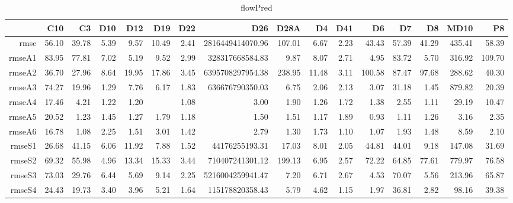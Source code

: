 \begin{table}[H]
\centering
\begin{tabular}{rrrrrrrrrrrrrrrr}
  \hline
 & C10 & C3 & D10 & D12 & D19 & D22 & D26 & D28A & D4 & D41 & D6 & D7 & D8 & MD10 & P8 \\ 
  \hline
rmse & 56.10 & 39.78 & 5.39 & 9.57 & 10.49 & 2.41 & 2816449414070.96 & 107.01 & 6.67 & 2.23 & 43.43 & 57.39 & 41.29 & 435.41 & 58.39 \\ 
  rmseA1 & 83.95 & 77.81 & 7.02 & 5.19 & 9.52 & 2.99 & 328317668584.83 & 9.87 & 8.07 & 2.71 & 4.95 & 83.72 & 5.70 & 316.92 & 109.70 \\ 
  rmseA2 & 36.70 & 27.96 & 8.64 & 19.95 & 17.86 & 3.45 & 6395708297954.38 & 238.95 & 11.48 & 3.11 & 100.58 & 87.47 & 97.68 & 288.62 & 40.30 \\ 
  rmseA3 & 74.27 & 19.96 & 1.29 & 7.76 & 6.17 & 1.83 & 636676790350.03 & 6.75 & 2.06 & 2.13 & 3.07 & 31.18 & 1.45 & 879.82 & 20.39 \\ 
  rmseA4 & 17.46 & 4.21 & 1.22 & 1.20 &  & 1.08 & 3.00 & 1.90 & 1.26 & 1.72 & 1.38 & 2.55 & 1.11 & 29.19 & 10.47 \\ 
  rmseA5 & 20.52 & 1.23 & 1.45 & 1.27 & 1.79 & 1.18 & 1.50 & 1.51 & 1.17 & 1.89 & 0.93 & 1.11 & 1.26 & 3.16 & 2.35 \\ 
  rmseA6 & 16.78 & 1.08 & 2.25 & 1.51 & 3.01 & 1.42 & 2.79 & 1.30 & 1.73 & 1.10 & 1.07 & 1.93 & 1.48 & 8.59 & 2.10 \\ 
  rmseS1 & 26.68 & 41.15 & 6.06 & 11.92 & 7.88 & 1.52 & 44176255193.31 & 17.03 & 8.01 & 2.05 & 44.81 & 44.01 & 9.18 & 147.08 & 31.69 \\ 
  rmseS2 & 69.32 & 55.98 & 4.96 & 13.34 & 15.33 & 3.44 & 710407241301.12 & 199.13 & 6.95 & 2.57 & 72.22 & 64.85 & 77.61 & 779.97 & 76.58 \\ 
  rmseS3 & 73.03 & 29.76 & 6.44 & 5.69 & 9.14 & 2.25 & 5216004259941.47 & 7.20 & 6.71 & 2.67 & 4.53 & 70.07 & 5.56 & 213.96 & 65.87 \\ 
  rmseS4 & 24.43 & 19.73 & 3.40 & 3.96 & 5.21 & 1.64 & 115178820358.43 & 5.79 & 4.62 & 1.15 & 1.97 & 36.81 & 2.82 & 98.16 & 39.38 \\ 
   \hline
\end{tabular}
\caption{flowPred} 
\end{table}
